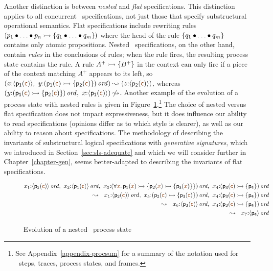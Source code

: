 Another
distinction is between  {\it nested} and {\it flat}
specifications. This distinction applies to all concurrent
\sls~specifications, not just those that specify substructural
operational semantics. Flat
specifications include rewriting rules $\left( p_1 \mathbin{\bullet} \ldots \mathbin{\bullet}
  p_n \rightarrowtail \{ q_1 \mathbin{\bullet} \ldots \mathbin{\bullet} q_m \} \right)$ where the head
of the rule $\{ q_1 \mathbin{\bullet} \ldots \mathbin{\bullet} q_m \}$ contains only atomic
propositions. Nested \sls~specifications, on the other hand,
contain {\it rules} in the conclusions of rules; when the rule fires,
the resulting process state contains the rule. 
A rule $A^+ \rightarrowtail \{ B^+ \}$ in the context can only fire if a piece 
of the context
matching $A^+$ appears to its left, so  $\left(x{:}\susp{\sf p_1(\lf{c})}, ~
y{:}\istrue{\left( {\sf p_1(\lf{c})} \lefti \{ {\sf p_2(\lf{c})} \} \right)}\right)
\leadsto \left(z{:}\susp{\sf p_2(\lf{c})}\right)$, whereas 
$\left(y{:}\istrue{\left( {\sf p_1(\lf{c})} \lefti \{ {\sf p_2(\lf{c})} \} \right)},~
x{:}\susp{\sf p_1(\lf{c})}\right)
\not \leadsto$. Another example of the evolution of a 
process state with nested rules is given 
in Figure~\ref{fig:ho-evo-ex}.\footnote{See
  Appendix~\ref{appendix-procsum} for a summary of the notation used for
  \sls~steps, traces, process states, and frames.}
%
The choice of nested versus flat specification does not impact
expressiveness, but it does influence our ability to read
specifications (opinions differ as to which style is clearer), as well
as our ability to reason about specifications. The methodology of
describing the invariants of substructural logical specifications with
{\it generative signatures}, which we introduced in
Section~\ref{sec:sls-adequate} and which we will consider further in
Chapter~\ref{chapter-gen}, 
seems better-adapted to describing the invariants of flat
specifications.

\begin{figure}[t]
{\small \begin{align*}
x_1{:}\istrue{\susp{{\sf p_2}(\lf{\sf c})}}, ~
x_2{:}\istrue{\susp{{\sf p_1}(\lf{\sf c})}}, ~
x_3{:}\istrue{(\forall \lf{x}.\,{\sf p_1}(\lf{x}) 
                \lefti \{ {\sf p_2}(\lf{x}) \lefti \{ {\sf p_3}(\lf{x}) \} \})}, ~
x_4{:}\istrue{({\sf p_3}(\lf{\sf c}) \lefti \{ {\sf p_4} \})} & \\
\leadsto ~~ 
x_1{:}\istrue{\susp{{\sf p_2}(\lf{\sf c})}}, ~
x_5{:}\istrue{({\sf p_2}(\lf{\sf c}) \lefti \{ {\sf p_3}(\lf{\sf c}) \})}, ~
x_4{:}\istrue{({\sf p_3}(\lf{\sf c}) \lefti \{ {\sf p_4} \})} & \\
\leadsto ~~ 
x_6{:}\istrue{\susp{{\sf p_3}(\lf{\sf c})}}, ~
x_4{:}\istrue{({\sf p_3}(\lf{\sf c}) \lefti \{ {\sf p_4} \})} & \\
\leadsto ~~ 
x_7{:}\istrue{\susp{{\sf p_4}}} & 
\end{align*}}\vspace{-18pt}
\caption{Evolution of a nested \sls~process state}
\label{fig:ho-evo-ex}
\end{figure}

